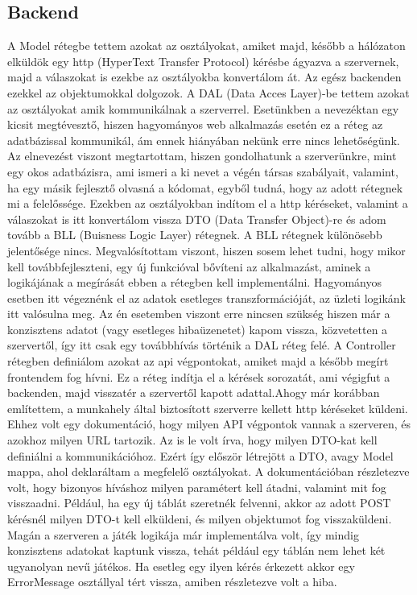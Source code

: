 \documentclass[a4paper,twoside]{article}
\begin{document}
\subsection{Backend}
A Model rétegbe tettem azokat az osztályokat, amiket majd, később a hálózaton elküldök egy
http (HyperText Transfer Protocol) kérésbe ágyazva a szervernek, majd a válaszokat is ezekbe
az osztályokba konvertálom át. Az egész backenden ezekkel az objektumokkal dolgozok.
A DAL (Data Acces Layer)-be tettem azokat az osztályokat amik kommunikálnak a
szerverrel. Esetünkben a nevezéktan egy kicsit megtévesztő, hiszen hagyományos web
alkalmazás esetén ez a réteg az adatbázissal kommunikál, ám ennek hiányában nekünk erre
nincs lehetőségünk. Az elnevezést viszont megtartottam, hiszen gondolhatunk a szerverünkre,
mint egy okos adatbázisra, ami ismeri a ki nevet a végén társas szabályait, valamint, ha egy
másik fejlesztő olvasná a kódomat, egyből tudná, hogy az adott rétegnek mi a felelőssége.
Ezekben az osztályokban indítom el a http kéréseket, valamint a válaszokat is itt konvertálom
vissza DTO (Data Transfer Object)-re és adom tovább a BLL (Buisness Logic Layer)
rétegnek.
A BLL rétegnek különösebb jelentősége nincs. Megvalósítottam viszont, hiszen sosem lehet
tudni, hogy mikor kell továbbfejleszteni, egy új funkcióval bővíteni az alkalmazást, aminek a
logikájának a megírását ebben a rétegben kell implementálni. Hagyományos esetben itt
végeznénk el az adatok esetleges transzformációját, az üzleti logikánk itt valósulna meg. Az
én esetemben viszont erre nincsen szükség hiszen már a konzisztens adatot (vagy esetleges
hibaüzenetet) kapom vissza, közvetetten a szervertől, így itt csak egy továbbhívás történik a
DAL réteg felé.
A Controller rétegben definiálom azokat az api végpontokat, amiket majd a később megírt
frontendem fog hívni. Ez a réteg indítja el a kérések sorozatát, ami végigfut a backenden,
majd visszatér a szervertől kapott adattal.Ahogy már korábban említettem, a munkahely által biztosított szerverre kellett http kéréseket
küldeni. Ehhez volt egy dokumentáció, hogy milyen API végpontok vannak a szerveren, és
azokhoz milyen URL tartozik. Az is le volt írva, hogy milyen DTO-kat kell definiálni a
kommunikációhoz. Ezért így először létrejött a DTO, avagy Model mappa, ahol deklaráltam a
megfelelő osztályokat. A dokumentációban részletezve volt, hogy bizonyos híváshoz milyen
paramétert kell átadni, valamint mit fog visszaadni. Például, ha egy új táblát szeretnék
felvenni, akkor az adott POST kérésnél milyen DTO-t kell elküldeni, és milyen objektumot
fog visszaküldeni. Magán a szerveren a játék logikája már implementálva volt, így mindig
konzisztens adatokat kaptunk vissza, tehát például egy táblán nem lehet két ugyanolyan nevű
játékos. Ha esetleg egy ilyen kérés érkezett akkor egy ErrorMessage osztállyal tért vissza,
amiben részletezve volt a hiba.
\end{document}

